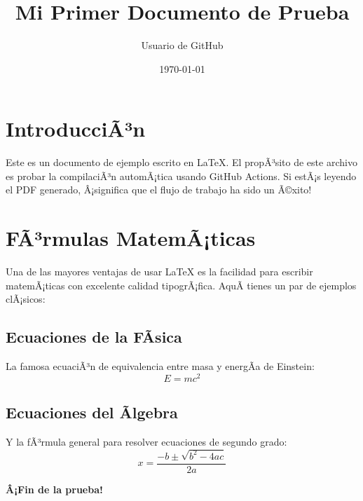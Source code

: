 \documentclass[12pt,a4paper]{article}
\title{Mi Primer Documento de Prueba}
\author{Usuario de GitHub}
\date{\today}
\begin{document}
\maketitle

\tableofcontents
\vspace{1cm} %

\section{IntroducciÃ³n}
Este es un documento de ejemplo escrito en \LaTeX. El propÃ³sito de este archivo es probar la compilaciÃ³n automÃ¡tica usando GitHub Actions. Si estÃ¡s leyendo el PDF generado, Â¡significa que el flujo de trabajo ha sido un Ã©xito!

\section{FÃ³rmulas MatemÃ¡ticas}
Una de las mayores ventajas de usar \LaTeX{} es la facilidad para escribir matemÃ¡ticas con excelente calidad tipogrÃ¡fica. AquÃ­ tienes un par de ejemplos clÃ¡sicos:

\subsection{Ecuaciones de la FÃ­sica}
La famosa ecuaciÃ³n de equivalencia entre masa y energÃ­a de Einstein:
\begin{equation}
    E = mc^2
\end{equation}

\subsection{Ecuaciones del Ãlgebra}
Y la fÃ³rmula general para resolver ecuaciones de segundo grado:
\begin{equation}
    x = \frac{-b \pm \sqrt{b^2 - 4ac}}{2a}
\end{equation}

\vspace{1cm}
\begin{center}
    \textbf{Â¡Fin de la prueba!}
\end{center}
\end{document}
